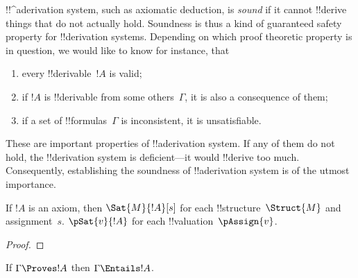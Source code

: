 \documentclass[../../../include/open-logic-section]{subfiles}
\begin{document}
      {}
      {}
      

\begin{explain}
!!^a{derivation} system, such as axiomatic deduction, is \emph{sound}
if it cannot !!{derive} things that do not actually hold.  Soundness is
thus a kind of guaranteed safety property for !!{derivation} systems.
Depending on which proof theoretic property is in question, we would
like to know for instance, that
\begin{enumerate}
\item every !!{derivable}~$!A$ is valid;
\item if $!A$ is !!{derivable} from some others~$\Gamma$, it is also a
  consequence of them;
\item if a set of !!{formula}s~$\Gamma$ is inconsistent, it is
  unsatisfiable.
\end{enumerate}
These are important properties of !!a{derivation} system.  If any of them do
not hold, the !!{derivation} system is deficient---it would !!{derive} too much.
Consequently, establishing the soundness of !!a{derivation} system is of the
utmost importance.
\end{explain}

\begin{prop}
  If $!A$ is an axiom, then
    {$\Sat{M}{!A}[s]$ for each !!{structure}~$\Struct{M}$ and assignment~$s$.}
    {$\pSat{v}{!A}$ for each !!{valuation}~$\pAssign{v}$.}
\end{prop}

\begin{proof}
\end{proof}

\begin{thm}[Soundness]
If $\Gamma \Proves !A$ then $\Gamma \Entails !A$.
\end{thm}
\end{document}
